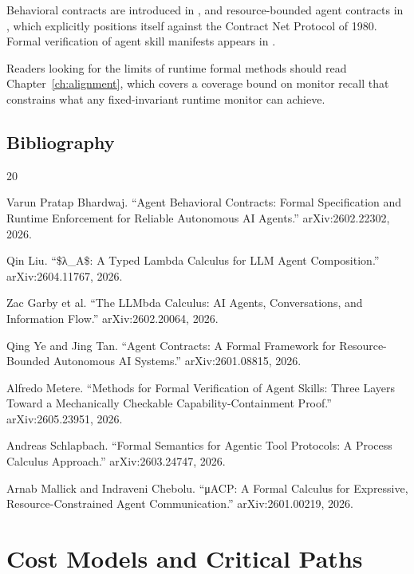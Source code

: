 \documentclass[11pt]{book}
\begin{document}
Behavioral contracts are introduced in \cite{agentcontracts2026}, and resource-bounded agent contracts in \cite{resourcecontracts2026}, which explicitly positions itself against the Contract Net Protocol of 1980. Formal verification of agent skill manifests appears in \cite{skillverify2026}.

Readers looking for the limits of runtime formal methods should read Chapter~\ref{ch:alignment}, which covers a coverage bound on monitor recall that constrains what any fixed-invariant runtime monitor can achieve.

\section*{Bibliography}

\begin{thebibliography}{20}

Varun Pratap Bhardwaj.
``Agent Behavioral Contracts: Formal Specification and Runtime Enforcement for Reliable Autonomous AI Agents.''
arXiv:2602.22302, 2026.

Qin Liu.
``\$λ\_A\$: A Typed Lambda Calculus for LLM Agent Composition.''
arXiv:2604.11767, 2026.

Zac Garby et al.
``The LLMbda Calculus: AI Agents, Conversations, and Information Flow.''
arXiv:2602.20064, 2026.

Qing Ye and Jing Tan.
``Agent Contracts: A Formal Framework for Resource-Bounded Autonomous AI Systems.''
arXiv:2601.08815, 2026.

Alfredo Metere.
``Methods for Formal Verification of Agent Skills: Three Layers Toward a Mechanically Checkable Capability-Containment Proof.''
arXiv:2605.23951, 2026.

Andreas Schlapbach.
``Formal Semantics for Agentic Tool Protocols: A Process Calculus Approach.''
arXiv:2603.24747, 2026.

Arnab Mallick and Indraveni Chebolu.
``μACP: A Formal Calculus for Expressive, Resource-Constrained Agent Communication.''
arXiv:2601.00219, 2026.

\end{thebibliography}
\chapter{Cost Models and Critical Paths}
\label{ch:cost}
\end{document}
